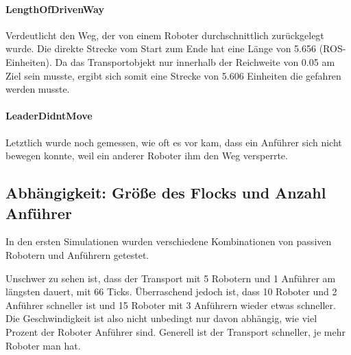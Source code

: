\paragraph*{LengthOfDrivenWay}
Verdeutlicht den Weg, der von einem Roboter durchschnittlich zurückgelegt wurde. Die direkte Strecke vom Start zum Ende hat eine Länge von 5.656 (ROS-Einheiten). Da das Transportobjekt nur innerhalb der Reichweite von 0.05 am Ziel sein musste, ergibt sich somit eine Strecke von 5.606 Einheiten die gefahren werden musste.

\paragraph*{LeaderDidntMove}
Letztlich wurde noch gemessen, wie oft es vor kam, dass ein Anführer sich nicht bewegen konnte, weil ein anderer Roboter ihm den Weg versperrte.

\subsection*{Abhängigkeit: Größe des Flocks und Anzahl Anführer}

In den ersten Simulationen wurden verschiedene Kombinationen von passiven Robotern und Anführern getestet.

Unschwer zu sehen ist, dass der Transport mit 5 Robotern und 1 Anführer am längsten dauert, mit 66 Ticks. Überraschend jedoch ist, dass 10 Roboter und 2 Anführer schneller ist und 15 Roboter mit 3 Anführern wieder etwas schneller. Die Geschwindigkeit ist also nicht unbedingt nur davon abhängig, wie viel Prozent der Roboter Anführer sind. Generell ist der Transport schneller, je mehr Roboter man hat.

